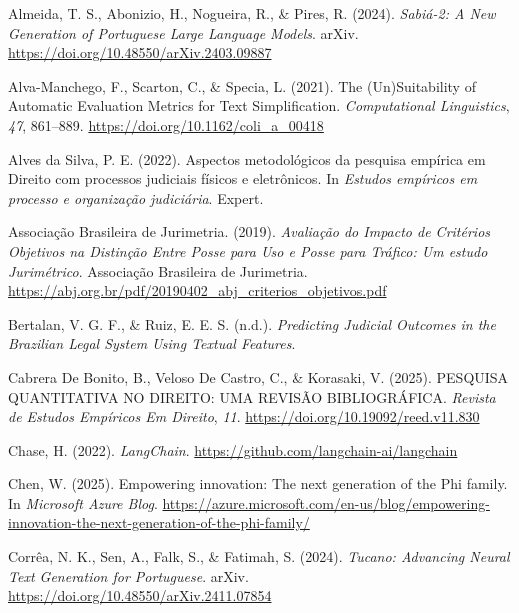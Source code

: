 \documentclass[
  12pt,
  letterpaper,
]{book}
\newlength{\cslhangindent}
\newenvironment{CSLReferences}[2] %
 {\begin{list}{}{%
  \setlength{\itemindent}{0pt}
  \setlength{\leftmargin}{0pt}
  \setlength{\parsep}{0pt}
  \ifodd #1
   \setlength{\leftmargin}{\cslhangindent}
   \setlength{\itemindent}{-1\cslhangindent}
  \fi
  \setlength{\itemsep}{#2\baselineskip}}}
 {\end{list}}
\begin{document}
\label{refs}
\begin{CSLReferences}{1}{0}
Almeida, T. S., Abonizio, H., Nogueira, R., \& Pires, R. (2024).
\emph{Sabiá-2: {A} {New} {Generation} of {Portuguese} {Large} {Language}
{Models}}. arXiv. \url{https://doi.org/10.48550/arXiv.2403.09887}

Alva-Manchego, F., Scarton, C., \& Specia, L. (2021). The
({Un}){Suitability} of {Automatic} {Evaluation} {Metrics} for {Text}
{Simplification}. \emph{Computational Linguistics}, \emph{47}, 861--889.
\url{https://doi.org/10.1162/coli_a_00418}

Alves da Silva, P. E. (2022). Aspectos metodológicos da pesquisa
empírica em {Direito} com processos judiciais físicos e eletrônicos. In
\emph{Estudos empíricos em processo e organização judiciária}. Expert.

Associação Brasileira de Jurimetria. (2019). \emph{Avaliação do
{Impacto} de {Critérios} {Objetivos} na {Distinção} {Entre} {Posse} para
{Uso} e {Posse} para {Tráfico}: {Um} estudo {Jurimétrico}}. Associação
Brasileira de Jurimetria.
\url{https://abj.org.br/pdf/20190402_abj_criterios_objetivos.pdf}

Bertalan, V. G. F., \& Ruiz, E. E. S. (n.d.). \emph{Predicting
{Judicial} {Outcomes} in the {Brazilian} {Legal} {System} {Using}
{Textual} {Features}}.

Cabrera De Bonito, B., Veloso De Castro, C., \& Korasaki, V. (2025).
{PESQUISA} {QUANTITATIVA} {NO} {DIREITO}: {UMA} {REVISÃO}
{BIBLIOGRÁFICA}. \emph{Revista de Estudos Empíricos Em Direito},
\emph{11}. \url{https://doi.org/10.19092/reed.v11.830}

Chase, H. (2022). \emph{{LangChain}}.
\url{https://github.com/langchain-ai/langchain}

Chen, W. (2025). Empowering innovation: {The} next generation of the
{Phi} family. In \emph{Microsoft Azure Blog}.
\url{https://azure.microsoft.com/en-us/blog/empowering-innovation-the-next-generation-of-the-phi-family/}

Corrêa, N. K., Sen, A., Falk, S., \& Fatimah, S. (2024). \emph{Tucano:
{Advancing} {Neural} {Text} {Generation} for {Portuguese}}. arXiv.
\url{https://doi.org/10.48550/arXiv.2411.07854}


\end{CSLReferences}
\end{document}
